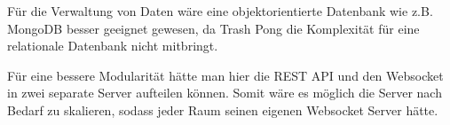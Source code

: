 \documentclass[
]{article}
\begin{document}
Für die Verwaltung von Daten wäre eine objektorientierte Datenbank wie z.B. MongoDB besser geeignet gewesen, da 
Trash Pong die Komplexität für eine relationale Datenbank nicht mitbringt. 

Für eine bessere Modularität hätte man hier die REST API und den Websocket in zwei separate Server aufteilen können.
Somit wäre es möglich die Server nach Bedarf zu skalieren, sodass jeder Raum seinen eigenen Websocket Server hätte.

\newpage
 \printbibliography[title={Quellen}]
\end{document}
